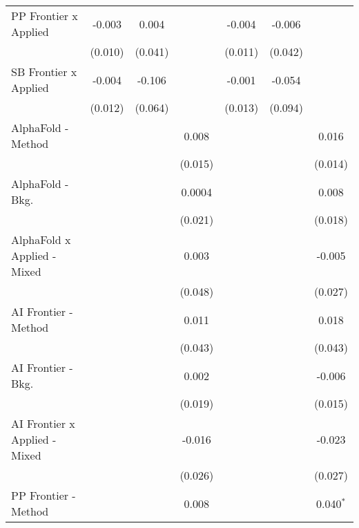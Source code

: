 \begin{tabular}{lcccccc}
   PP Frontier x Applied          & -0.003      & 0.004          &              & -0.004      & -0.006       &   \\   
                                  & (0.010)     & (0.041)        &              & (0.011)     & (0.042)      &   \\   
   SB Frontier x Applied          & -0.004      & -0.106         &              & -0.001      & -0.054       &   \\   
                                  & (0.012)     & (0.064)        &              & (0.013)     & (0.094)      &   \\   
   AlphaFold - Method             &             &                & 0.008        &             &              & 0.016\\   
                                  &             &                & (0.015)      &             &              & (0.014)\\   
   AlphaFold - Bkg.               &             &                & 0.0004       &             &              & 0.008\\   
                                  &             &                & (0.021)      &             &              & (0.018)\\   
   AlphaFold x Applied - Mixed    &             &                & 0.003        &             &              & -0.005\\   
                                  &             &                & (0.048)      &             &              & (0.027)\\   
   AI Frontier - Method           &             &                & 0.011        &             &              & 0.018\\   
                                  &             &                & (0.043)      &             &              & (0.043)\\   
   AI Frontier - Bkg.             &             &                & 0.002        &             &              & -0.006\\   
                                  &             &                & (0.019)      &             &              & (0.015)\\   
   AI Frontier x Applied - Mixed  &             &                & -0.016       &             &              & -0.023\\   
                                  &             &                & (0.026)      &             &              & (0.027)\\   
   PP Frontier - Method           &             &                & 0.008        &             &              & 0.040$^{*}$\\   

\end{tabular}
